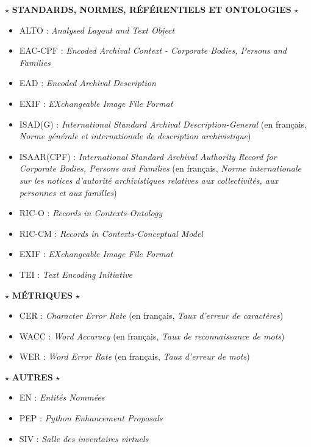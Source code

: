 \begin{center}
$\star$ \textbf{\textsc{STANDARDS, NORMES, RÉFÉRENTIELS ET ONTOLOGIES}} $\star$
\end{center} 
\begin{itemize}
    \item ALTO : \emph{Analysed Layout and Text Object}
    \item EAC-CPF : \emph{Encoded Archival Context - Corporate Bodies, Persons and Families} 
    \item EAD : \emph{Encoded Archival Description} 
    \item EXIF : \emph{EXchangeable Image File Format}
    \item ISAD(G) : \emph{International Standard Archival Description-General} (en français, \emph{Norme générale et internationale de description archivistique})
    \item ISAAR(CPF) : \emph{International Standard Archival Authority Record for Corporate Bodies, Persons and Families} (en français, \emph{Norme internationale sur les notices d'autorité archivistiques relatives aux collectivités, aux personnes et aux familles})
    \item RIC-O : \emph{Records in Contexts-Ontology}
    \item RIC-CM : \emph{Records in Contexts-Conceptual Model}
    \item EXIF : \emph{EXchangeable Image File Format}
    \item TEI : \emph{Text Encoding Initiative} 
\end{itemize}

\begin{center}
$\star$ \textbf{\textsc{MÉTRIQUES}} $\star$
\end{center} 
\begin{itemize}
    \item CER : \emph{Character Error Rate} (en français, \emph{Taux d'erreur de caractères})
    \item WACC : \emph{Word Accuracy} (en français, \emph{Taux de reconnaissance de mots})
    \item WER : \emph{Word Error Rate} (en français, \emph{Taux d'erreur de mots})
\end{itemize}

\begin{center}
$\star$ \textbf{\textsc{AUTRES}} $\star$
\end{center} 
\begin{itemize}
    \item EN : \emph{Entités Nommées}
    \item PEP : \emph{Python Enhancement Proposals}
    \item SIV : \emph{Salle des inventaires virtuels} 
\end{itemize}

\newpage
\thispagestyle{empty}